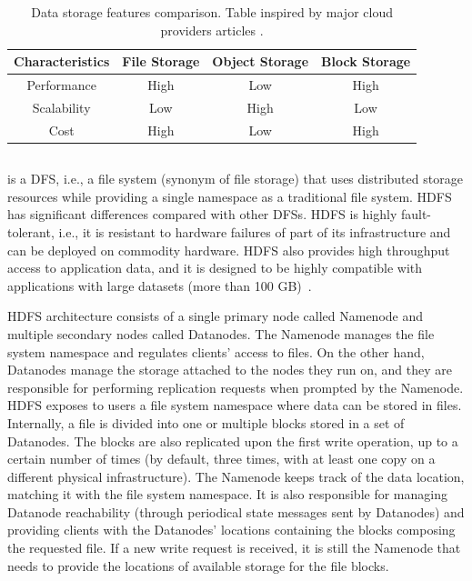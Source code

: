 \begin{table}[!ht]
    \begin{center}
      \caption[Data storage features comparison]{Data storage features comparison. Table inspired by major cloud providers articles \cite{BlockVsFile,HowObjectVs}.}
      \label{tab:storagecomparison}
      \begin{tabular}{cccc} %
        \toprule
        \textbf{Characteristics}\Tstrut\Bstrut & \textbf{File Storage} & \textbf{Object Storage} & \textbf{Block Storage}\\
        \midrule
        Performance & High & Low & High\Tstrut\\
        Scalability & Low & High & Low\\
        Cost & High & Low & High\Bstrut\\
        \bottomrule
      \end{tabular}
    \end{center}
\end{table}

\subsection{}

 is a \gls{DFS}, i.e., a file system (synonym of file storage) that uses distributed storage resources while providing a single namespace as a traditional file system. \gls{HDFS} has significant differences compared with other \glspl{DFS}. \gls{HDFS} is highly fault-tolerant, i.e., it is resistant to hardware failures of part of its infrastructure and can be deployed on commodity hardware. \gls{HDFS} also provides high throughput access to application data, and it is designed to be highly compatible with applications with large datasets (more than 100 GB)~\cite{borthakurHadoopDistributedFile2005}. 

\gls{HDFS} architecture consists of a single primary node called Namenode and multiple secondary nodes called Datanodes. The Namenode manages the file system namespace and regulates clients' access to files. On the other hand, Datanodes manage the storage attached to the nodes they run on, and they are responsible for performing replication requests when prompted by the Namenode. \gls{HDFS} exposes to users a file system namespace where data can be stored in files. Internally, a file is divided into one or multiple blocks stored in a set of Datanodes. The blocks are also replicated upon the first write operation, up to a certain number of times (by default, three times, with at least one copy on a different physical infrastructure). The Namenode keeps track of the data location, matching it with the file system namespace. It is also responsible for managing Datanode reachability (through periodical state messages sent by Datanodes) and providing clients with the Datanodes' locations containing the blocks composing the requested file. If a new write request is received, it is still the Namenode that needs to provide the locations of available storage for the file blocks. 

